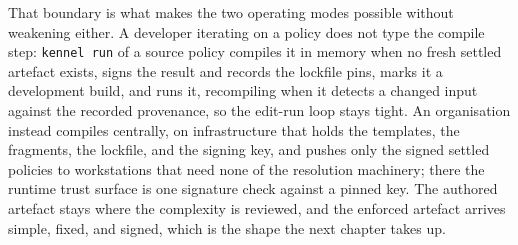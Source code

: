 That boundary is what makes the two operating modes possible without
weakening either. A developer iterating on a policy does not type the
compile step: \texttt{kennel\ run} of a source policy compiles it in
memory when no fresh settled artefact exists, signs the result and
records the lockfile pins, marks it a development build, and runs it,
recompiling when it detects a changed input against the recorded
provenance, so the edit-run loop stays tight. An organisation instead
compiles centrally, on infrastructure that holds the templates, the
fragments, the lockfile, and the signing key, and pushes only the signed
settled policies to workstations that need none of the resolution
machinery; there the runtime trust surface is one signature check
against a pinned key. The authored artefact stays where the complexity
is reviewed, and the enforced artefact arrives simple, fixed, and
signed, which is the shape the next chapter takes up.
